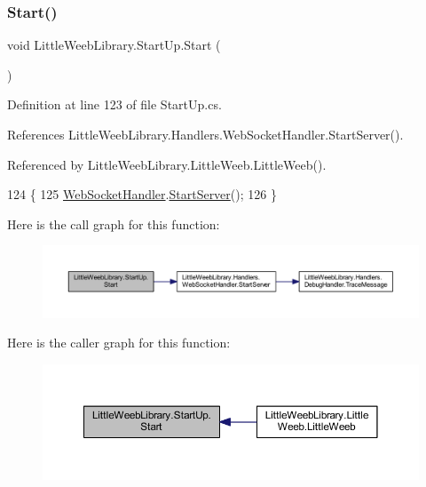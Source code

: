 \subsubsection{\texorpdfstring{Start()}{Start()}}
{\footnotesize\ttfamily void Little\+Weeb\+Library.\+Start\+Up.\+Start (\begin{DoxyParamCaption}{ }\end{DoxyParamCaption})}



Definition at line 123 of file Start\+Up.\+cs.



References Little\+Weeb\+Library.\+Handlers.\+Web\+Socket\+Handler.\+Start\+Server().



Referenced by Little\+Weeb\+Library.\+Little\+Weeb.\+Little\+Weeb().


\begin{DoxyCode}
124         \{
125             \mbox{\hyperlink{class_little_weeb_library_1_1_handlers_1_1_web_socket_handler}{WebSocketHandler}}.\mbox{\hyperlink{class_little_weeb_library_1_1_handlers_1_1_web_socket_handler_a23d4ffbabdb67c97ea843d4e7dc5cbdd}{StartServer}}();
126         \}
\end{DoxyCode}
Here is the call graph for this function\+:\nopagebreak
\begin{figure}[H]
\begin{center}
\leavevmode
\includegraphics[width=350pt]{class_little_weeb_library_1_1_start_up_a2ea98092dfdb92bfc6decfdc373d6e78_cgraph}
\end{center}
\end{figure}
Here is the caller graph for this function\+:\nopagebreak
\begin{figure}[H]
\begin{center}
\leavevmode
\includegraphics[width=350pt]{class_little_weeb_library_1_1_start_up_a2ea98092dfdb92bfc6decfdc373d6e78_icgraph}
\end{center}
\end{figure}
\mbox{\label{class_little_weeb_library_1_1_start_up_aaa6147f0dd162c1962e575689dcb22c5}} 
